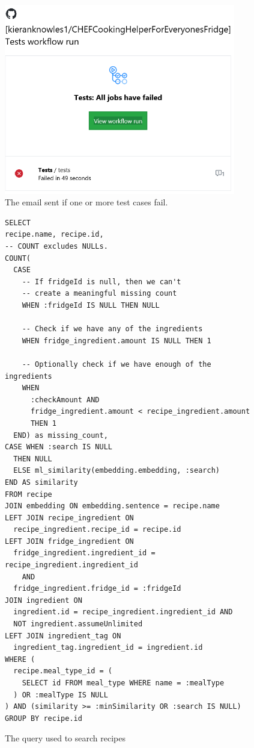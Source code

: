 \begin{figure}
  \centering
  \caption{\label{fig:test_failure}The email sent if one or more test cases fail.}
  \includegraphics[width=0.9\textwidth]{figures/test_failure.png}
\end{figure}

\cleartoleftpage\begin{figure}
  \centering
  \caption{\label{fig:search_query}The query used to search recipes}
  \begin{verbatim}
SELECT
recipe.name, recipe.id,
-- COUNT excludes NULLs.
COUNT(
  CASE
    -- If fridgeId is null, then we can't
    -- create a meaningful missing count
    WHEN :fridgeId IS NULL THEN NULL

    -- Check if we have any of the ingredients
    WHEN fridge_ingredient.amount IS NULL THEN 1

    -- Optionally check if we have enough of the ingredients
    WHEN
      :checkAmount AND
      fridge_ingredient.amount < recipe_ingredient.amount
      THEN 1
  END) as missing_count,
CASE WHEN :search IS NULL
  THEN NULL
  ELSE ml_similarity(embedding.embedding, :search)
END AS similarity
FROM recipe
JOIN embedding ON embedding.sentence = recipe.name
LEFT JOIN recipe_ingredient ON
  recipe_ingredient.recipe_id = recipe.id
LEFT JOIN fridge_ingredient ON
  fridge_ingredient.ingredient_id = recipe_ingredient.ingredient_id
    AND
  fridge_ingredient.fridge_id = :fridgeId
JOIN ingredient ON
  ingredient.id = recipe_ingredient.ingredient_id AND
  NOT ingredient.assumeUnlimited
LEFT JOIN ingredient_tag ON
  ingredient_tag.ingredient_id = ingredient.id
WHERE (
  recipe.meal_type_id = (
    SELECT id FROM meal_type WHERE name = :mealType
  ) OR :mealType IS NULL
) AND (similarity >= :minSimilarity OR :search IS NULL)
GROUP BY recipe.id
  \end{verbatim}
\end{figure}

